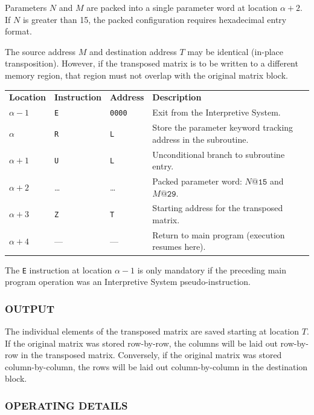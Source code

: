 \documentclass{article}
\begin{document}
Parameters $N$ and $M$ are packed into a single parameter word at location $\alpha+2$. If $N$ is greater than 15, the packed configuration requires hexadecimal entry format. 

\noindent
The source address $M$ and destination address $T$ may be identical (in-place transposition). However, if the transposed matrix is to be written to a different memory region, that region must not overlap with the original matrix block.

\medskip
\noindent
\begin{tabular}{llll}
\textbf{Location} & \textbf{Instruction} & \textbf{Address} & \textbf{Description} \\
$\alpha - 1$      & \texttt{E}            & \texttt{0000}    & Exit from the Interpretive System. \\
$\alpha$          & \texttt{R}            & \texttt{L}       & Store the parameter keyword tracking address in the subroutine. \\
$\alpha + 1$      & \texttt{U}            & \texttt{L}       & Unconditional branch to subroutine entry. \\
$\alpha + 2$      & \dots                 & \dots            & Packed parameter word: $N\texttt{@15}$ and $M\texttt{@29}$. \\
$\alpha + 3$      & \texttt{Z}            & \texttt{T}       & Starting address for the transposed matrix. \\
$\alpha + 4$      & ---                   & ---              & Return to main program (execution resumes here).
\end{tabular}

\medskip
\noindent
The \texttt{E} instruction at location $\alpha - 1$ is only mandatory if the preceding main program operation was an Interpretive System pseudo-instruction.

\subsubsection*{OUTPUT}
The individual elements of the transposed matrix are saved starting at location $T$. If the original matrix was stored row-by-row, the columns will be laid out row-by-row in the transposed matrix. Conversely, if the original matrix was stored column-by-column, the rows will be laid out column-by-column in the destination block.

\subsubsection*{OPERATING DETAILS}
\end{document}
